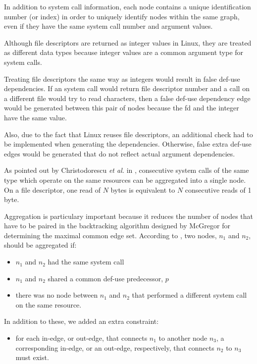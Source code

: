 In addition to system call information, each node contains a unique identification number (or index) in order to uniquely identify nodes within the same graph, even if they have the same system call number and argument values.

Although file descriptors are returned as integer values in Linux, they are treated as different data types because integer values are a common argument type for system calls. 

Treating file descriptors the same way as integers would result in false def-use dependencies. If an  system call would return file descriptor number  and a  call on a different file would try to read  characters, then a false def-use dependency edge would be generated between this pair of nodes because the fd and the integer have the same value.

Also, due to the fact that Linux reuses file descriptors, an additional check had to be implemented when generating the dependencies. Otherwise, false extra def-use edges would be generated that do not reflect actual argument dependencies.

As pointed out by Christodorescu \textit{et al.} in \cite{mining-specifications}, consecutive system calls of the same type which operate on the same resources can be aggregated into a single node. On a file descriptor, one read of $N$ bytes is equivalent to $N$ consecutive reads of 1 byte.

Aggregation is particulary important because it reduces the number of nodes that have to be paired in the backtracking algorithm designed by McGregor for determining the maximal common edge set. According to \cite{mining-specifications}, two nodes, $n_1$ and $n_2$, should be aggregated if:

\begin{itemize}
	\item $n_1$ and $n_2$ had the same system call
	\item $n_1$ and $n_2$ shared a common def-use predecessor, $p$
	\item there was no node between $n_1$ and $n_2$ that performed a different system call on the same resource.
\end{itemize}

In addition to these, we added an extra constraint:

\begin{itemize}
	\item for each in-edge, or out-edge, that connects $n_1$ to another node $n_3$, a corresponding in-edge, or an out-edge, respectively, that connects $n_2$ to $n_3$ must exist.
\end{itemize}

